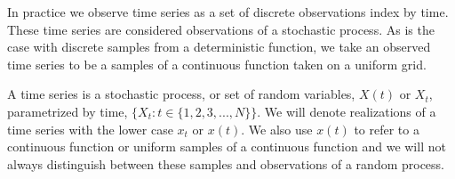   In practice we observe time series as a set of discrete 
  observations index by time. These time series are considered
  observations of a stochastic process. As is the case 
  with discrete
  samples from a deterministic function, we take an observed
  time series to be a samples of a continuous function taken 
  on a uniform grid.

  A time series is a stochastic process, or set of random 
  variables, $X(t)$ or $X_t$, parametrized by time, 
  $\{ X_t: t \in \{ 1,2,3,...,N\}\}$.  
   We will denote realizations of a time series
   with the lower case 
  $x_t$ or $x(t)$. We also use $x(t)$ to refer to a continuous function or uniform samples of a continuous function and we 
  will not always distinguish between these samples and observations of a random process. 

